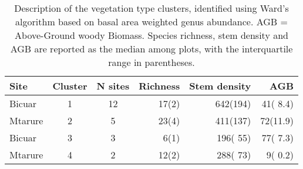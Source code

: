 \begin{table}[]
\centering
\caption{Description of the vegetation type clusters, identified using Ward's algorithm based on basal area weighted genus abundance. AGB = Above-Ground woody Biomass. Species richness, stem density and AGB are reported as the median among plots, with the interquartile range in parentheses.} 
\label{clust_summ}
\begin{tabular}{lcS[table-format=2.0]rrr}
  \toprule
{Site} & {Cluster} & {N sites} & {Richness} & {Stem density} & {AGB} \\ 
  \midrule
Bicuar & 1 & 12 & 17(2) & 642(194) & 41( 8.4) \\ 
  Mtarure & 2 & 5 & 23(4) & 411(137) & 72(11.9) \\ 
  Bicuar & 3 & 3 &  6(1) & 196( 55) & 77( 7.3) \\ 
  Mtarure & 4 & 2 & 12(2) & 288( 73) &  9( 0.2) \\ 
   \bottomrule
\end{tabular}
\end{table}

